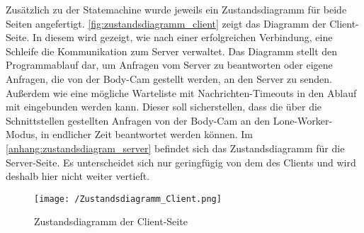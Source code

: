 \documentclass[thesis.tex]{subfiles}
\begin{document}
Zusätzlich zu der Statemachine wurde jeweils ein Zustandsdiagramm für beide Seiten angefertigt.
\autoref{fig:zustandsdiagramm_client} zeigt das Diagramm der Client-Seite.
In diesem wird gezeigt, wie nach einer erfolgreichen Verbindung, eine Schleife die Kommunikation zum Server verwaltet.
Das Diagramm stellt den Programmablauf dar, um Anfragen vom Server zu beantworten oder eigene Anfragen, die von der Body-Cam gestellt werden, an den Server zu senden.
Außerdem wie eine mögliche Warteliste mit Nachrichten-Timeouts in den Ablauf mit eingebunden werden kann.
Dieser soll sicherstellen, dass die über die Schnittstellen gestellten Anfragen von der Body-Cam an den Lone-Worker-Modus, in endlicher Zeit beantwortet werden können.
Im \autoref{anhang:zustandsdiagram_server} befindet sich das Zustandsdiagramm für die Server-Seite.
Es unterscheidet sich nur geringfügig von dem des Clients und wird deshalb hier nicht weiter vertieft.

\begin{figure}[h]
    \centering
    \texttt{[image: /Zustandsdiagramm\_Client.png]}
    \caption{Zustandsdiagramm der Client-Seite}
    \label{fig:zustandsdiagramm_client}
\end{figure}

\subfilebib %
\end{document}
